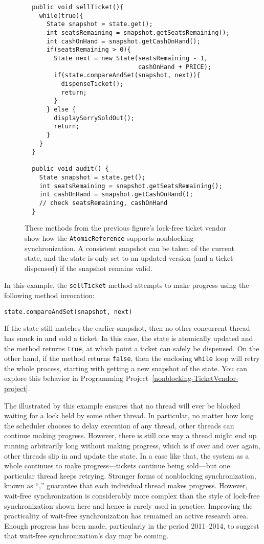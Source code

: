 \begin{figure}
\begin{verbatim}    
  public void sellTicket(){
    while(true){
      State snapshot = state.get();
      int seatsRemaining = snapshot.getSeatsRemaining();
      int cashOnHand = snapshot.getCashOnHand();
      if(seatsRemaining > 0){
        State next = new State(seatsRemaining - 1,
                               cashOnHand + PRICE);
        if(state.compareAndSet(snapshot, next)){
          dispenseTicket();
          return;
        }
      } else {
        displaySorrySoldOut();
        return;
      }
    }
  }
    
  public void audit() { 
    State snapshot = state.get();
    int seatsRemaining = snapshot.getSeatsRemaining();
    int cashOnHand = snapshot.getCashOnHand();
    // check seatsRemaining, cashOnHand
  } 
\end{verbatim}
\caption{These methods from the previous figure's lock-free ticket vendor show how the \texttt{AtomicReference} supports nonblocking synchronization.  A consistent snapshot can be taken of the current state, and the state is only set to an updated version
 (and a ticket dispensed) if the snapshot remains valid.}
\label{nonblocking-TicketVendor2}
\end{figure}

In this example, the \texttt{sellTicket} method attempts to make progress using the following method invocation:
\begin{verbatim}
state.compareAndSet(snapshot, next)
\end{verbatim}
If the state still matches the earlier snapshot, then no other concurrent thread has snuck in and sold a ticket.
In this case, the state is atomically updated and the method returns \texttt{true}, at which point a ticket can
safely be dispensed.  On the other hand, if the method returns \texttt{false}, then the enclosing \texttt{while} loop
will retry the whole process, starting with getting a new snapshot of the state.  You can explore this behavior in Programming Project~\ref{nonblocking-TicketVendor-project}.

The  illustrated by this example ensures that
no thread will ever be blocked waiting for a lock held by some other
thread.  In particular, no matter how long the scheduler chooses to
delay execution of any thread, other threads can continue making
progress.  However, there is still one way a thread might end up
running arbitrarily long without making progress, which is if over and
over again, other threads slip in and update the state.  In a case
like that, the system as a whole continues to make progress---tickets
continue being sold---but one particular thread keeps retrying.
Stronger forms of nonblocking synchronization, known as ``,'' guarantee that each individual thread makes
progress.  However, wait-free synchronization is considerably more
complex than the style of lock-free synchronization shown here
and hence is rarely used in practice. Improving the practicality of
wait-free synchronization has remained an active research area. Enough
progress has been made, particularly in the period 2011--2014, to suggest that
wait-free synchronization's day may be coming.

